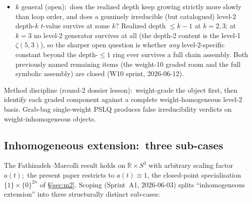 \documentclass[11pt,a4paper]{article}
\theoremstyle{plain}
\theoremstyle{definition}
\newcommand{\sthree}{S^{3}}
\newcommand{\R}{\mathbb{R}}
\newcommand{\Q}{\mathbb{Q}}
\begin{document}
\begin{itemize}
    Thm.~2.21 of arXiv:2204.14183) plus four clean stuffles identify
    all four weight-10 triples individually; in the full assembly the
    three antisymmetric doubles cancel identically, and
    $S^{(3)} \in \Q[\pi^2, \ln 2, \zeta(3), \zeta(5), \zeta(5,3)]$
    explicitly --- the sole depth-2 constant is the \emph{level-1}
    generator $\zeta(5,3)$, at coefficient $6\pi^2$ (falsifiers
    \texttt{tests/test\_s3\_decomposition.py} and
    \texttt{tests/test\_s3\_w10\_identification.py}).  New depth
    arrives from level 1; the level-2 sector stays at realized depth
    $\le 1$.  All weight-$\le 7$ closed forms are
    verbatim rows of Hoffman's published Appendix~A --- the PSLQ
    identifications independently rediscovered the table, and the
    $t_3(3,4,1)$ explicit form appears to be new.
  \item $k$ general (open):\ does the realized depth keep growing
    strictly more slowly than loop order, and does a genuinely
    irreducible (but catalogued) level-2 depth-$k$ $t$-value survive
    at some $k$?  Realized depth $\le k - 1$ at $k = 2, 3$; at $k = 3$
    no level-2 generator survives at all (the depth-2 content is the
    level-1 $\zeta(5,3)$), so the sharper open question is whether
    \emph{any} level-2-specific constant beyond the depth-$\le 1$
    ring ever survives a full chain assembly.  Both previously named
    remaining items (the weight-10 graded room and the full symbolic
    assembly) are closed (W10 sprint, 2026-06-12).
\end{itemize}
Method discipline (round-2 dossier lesson):\ weight-grade the object
first, then identify each graded component against a complete
weight-homogeneous level-2 basis.  Grab-bag single-weight PSLQ
produces false irreducibility verdicts on weight-inhomogeneous
objects.

\subsection{Inhomogeneous extension:\ three sub-cases}
\label{subsec:open_inhomo}

The Fathizadeh--Marcolli result holds on $\R \times \sthree$ with
arbitrary scaling factor $a(t)$;\ the present paper restricts to
$a(t) \equiv 1$, the closed-point specialisation $\{1\} \times \{0\}^{2n}$
of \S\ref{sec:m2}.  Scoping (Sprint~A1, 2026-06-03) splits ``inhomogeneous
extension'' into three structurally distinct sub-cases:
\end{document}
